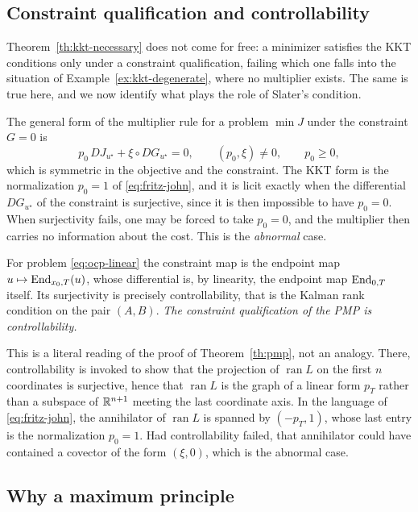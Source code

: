 \subsection{Constraint qualification and controllability}

Theorem~\ref{th:kkt-necessary} does not come for free: a minimizer satisfies the KKT conditions only under a constraint qualification, failing which one falls into the situation of Example~\ref{ex:kkt-degenerate}, where no multiplier exists. The same is true here, and we now identify what plays the role of Slater's condition.

The general form of the multiplier rule for a problem $\min J$ under the constraint $G=0$ is
\begin{equation}
    \label{eq:fritz-john}
    p_0 \, DJ_{u^\star} + \xi \circ DG_{u^\star} = 0,
    \qquad (p_0,\xi)\neq 0,
    \qquad p_0 \ge 0,
\end{equation}
which is symmetric in the objective and the constraint. The KKT form is the normalization $p_0=1$ of \eqref{eq:fritz-john}, and it is licit exactly when the differential $DG_{u^\star}$ of the constraint is surjective, since it is then impossible to have $p_0=0$. When surjectivity fails, one may be forced to take $p_0=0$, and the multiplier then carries no information about the cost. This is the \emph{abnormal} case.

For problem \eqref{eq:ocp-linear} the constraint map is the endpoint map $u\mapsto \operatorname{End}_{x_0,T}(u)$, whose differential is, by linearity, the endpoint map $\operatorname{End}_{0,T}$ itself. Its surjectivity is precisely controllability, that is the Kalman rank condition on the pair $(A,B)$. \emph{The constraint qualification of the PMP is controllability.}

This is a literal reading of the proof of Theorem~\ref{th:pmp}, not an analogy. There, controllability is invoked to show that the projection of $\operatorname{ran}L$ on the first $n$ coordinates is surjective, hence that $\operatorname{ran} L$ is the graph of a linear form $p_T$ rather than a subspace of $\mathbb{R}^{n+1}$ meeting the last coordinate axis. In the language of \eqref{eq:fritz-john}, the annihilator of $\operatorname{ran}L$ is spanned by $(-p_T,1)$, whose last entry is the normalization $p_0=1$. Had controllability failed, that annihilator could have contained a covector of the form $(\xi,0)$, which is the abnormal case.

\subsection{Why a maximum principle}


